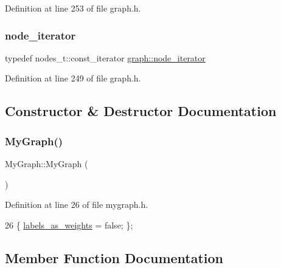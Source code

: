 Definition at line 253 of file graph.\+h.

\mbox{\label{classgraph_a2cb374b84c133ce13f94e73c3e5da7fa}} 
\subsubsection{\texorpdfstring{node\+\_\+iterator}{node\_iterator}}
{\footnotesize\ttfamily typedef nodes\+\_\+t\+::const\+\_\+iterator \mbox{\hyperlink{classgraph_a2cb374b84c133ce13f94e73c3e5da7fa}{graph\+::node\+\_\+iterator}}\hspace{0.3cm}{\ttfamily [inherited]}}



Definition at line 249 of file graph.\+h.



\subsection{Constructor \& Destructor Documentation}
\mbox{\label{class_my_graph_a28bf434d062ec896de127989fe9ed303}} 
\subsubsection{\texorpdfstring{My\+Graph()}{MyGraph()}}
{\footnotesize\ttfamily My\+Graph\+::\+My\+Graph (\begin{DoxyParamCaption}{ }\end{DoxyParamCaption})\hspace{0.3cm}{\ttfamily [inline]}}



Definition at line 26 of file mygraph.\+h.


\begin{DoxyCode}
26 \{ \mbox{\hyperlink{class_my_graph_a1c451264db5a154029533d9368b90317}{labels\_as\_weights}} = \textcolor{keyword}{false}; \};
\end{DoxyCode}


\subsection{Member Function Documentation}
\mbox{\label{classgraph_af0c7aba21d57d827ae96cae632441651}} 
